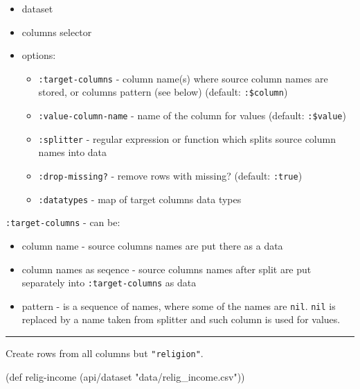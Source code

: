 \documentclass[]{article}
\newenvironment{Shaded}{\begin{snugshade}}{\end{snugshade}}
\newcommand{\StringTok}[1]{\textcolor[rgb]{0.31,0.60,0.02}{#1}}
\newcommand{\FunctionTok}[1]{\textcolor[rgb]{0.00,0.00,0.00}{#1}}
\newcommand{\BuiltInTok}[1]{#1}
\newcommand{\NormalTok}[1]{#1}
\providecommand{\tightlist}{%
  \setlength{\itemsep}{0pt}\setlength{\parskip}{0pt}}
\begin{document}
\begin{itemize}
\tightlist
\item
  dataset
\item
  columns selector
\item
  options:

  \begin{itemize}
  \tightlist
  \item
    \texttt{:target-columns} - column name(s) where source column names
    are stored, or columns pattern (see below) (default:
    \texttt{:\$column})
  \item
    \texttt{:value-column-name} - name of the column for values
    (default: \texttt{:\$value})
  \item
    \texttt{:splitter} - regular expression or function which splits
    source column names into data
  \item
    \texttt{:drop-missing?} - remove rows with missing? (default:
    \texttt{:true})
  \item
    \texttt{:datatypes} - map of target columns data types
  \end{itemize}
\end{itemize}

\texttt{:target-columns} - can be:

\begin{itemize}
\tightlist
\item
  column name - source columns names are put there as a data
\item
  column names as seqence - source columns names after split are put
  separately into \texttt{:target-columns} as data
\item
  pattern - is a sequence of names, where some of the names are
  \texttt{nil}. \texttt{nil} is replaced by a name taken from splitter
  and such column is used for values.
\end{itemize}

\begin{center}\rule{0.5\linewidth}{0.5pt}\end{center}

Create rows from all columns but \texttt{"religion"}.

\begin{Shaded}
\begin{Highlighting}[]
\NormalTok{(}\BuiltInTok{def}\FunctionTok{ relig-income }\NormalTok{(api/dataset }\StringTok{"data/relig_income.csv"}\NormalTok{))}
\end{Highlighting}
\end{Shaded}
\end{document}
